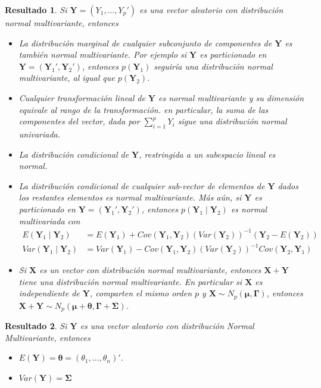 \documentclass[
  10pt,
  spanish,
]{book}
\providecommand{\tightlist}{%
  \setlength{\itemsep}{0pt}\setlength{\parskip}{0pt}}
\newtheorem{proposition}{Resultado}[chapter]
\theoremstyle{definition}
\theoremstyle{definition}
\theoremstyle{definition}
\theoremstyle{definition}
\theoremstyle{remark}
\begin{document}
\begin{proposition}
\protect\hypertarget{prp:normalmulti}{}{\label{prp:normalmulti} }Si \(\mathbf{Y}=(Y_1,\ldots,Y_p')\) es una vector aleatorio con distribución normal multivariante, entonces

\begin{itemize}
\tightlist
\item
  La distribución marginal de cualquier subconjunto de componentes de \(\mathbf{Y}\) es también normal multivariante. Por ejemplo si \(\mathbf{Y}\) es particionado en \(\mathbf{Y}=(\mathbf{Y}_1',\mathbf{Y}_2')\), entonces \(p(\mathbf{Y}_1)\) seguiría una distribución normal multivariante, al igual que \(p(\mathbf{Y}_2)\).
\item
  Cualquier transformación lineal de \(\mathbf{Y}\) es normal multivariante y su dimensión equivale al rango de la transformación. en particular, la suma de las componentes del vector, dada por \(\sum_{i=1}^pY_i\) sigue una distribución normal univariada.
\item
  La distribución condicional de \(\mathbf{Y}\), restringida a un subespacio lineal es normal.
\item
  La distribución condicional de cualquier sub-vector de elementos de \(\mathbf{Y}\) dados los restantes elementos es normal multivariante. Más aún, si \(\mathbf{Y}\) es particionado en \(\mathbf{Y}=(\mathbf{Y}_1',\mathbf{Y}_2')\), entonces \(p(\mathbf{Y}_1 \mid \mathbf{Y}_2)\) es normal multivariada con
  \begin{align*}
  E(\mathbf{Y}_1 \mid \mathbf{Y}_2)&=E(\mathbf{Y}_1)+Cov(\mathbf{Y}_1,\mathbf{Y}_2)(Var(\mathbf{Y}_2))^{-1}(\mathbf{Y}_2-E(\mathbf{Y}_2))\\
  Var(\mathbf{Y}_1 \mid \mathbf{Y}_2)&=Var(\mathbf{Y}_1)-Cov(\mathbf{Y}_1,\mathbf{Y}_2)(Var(\mathbf{Y}_2))^{-1}Cov(\mathbf{Y}_2,\mathbf{Y}_1)
  \end{align*}
\item
  Si \(\mathbf{X}\) es un vector con distribución normal multivariante, entonces \(\mathbf{X}+\mathbf{Y}\) tiene una distribución normal multivariante. En particular si \(\mathbf{X}\) es independiente de \(\mathbf{Y}\), comparten el mismo orden \(p\) y \(\mathbf{X}\sim N_p(\boldsymbol \mu,\boldsymbol \Gamma)\), entonces \(\mathbf{X}+\mathbf{Y}\sim N_p(\boldsymbol \mu+\boldsymbol \theta,\boldsymbol \Gamma+\boldsymbol \Sigma)\).
\end{itemize}
\end{proposition}

\begin{proposition}
\protect\hypertarget{prp:unnamed-chunk-56}{}{\label{prp:unnamed-chunk-56} }Si \(\mathbf{Y}\) es una vector aleatorio con distribución Normal Multivariante, entonces

\begin{itemize}
\tightlist
\item
  \(E(\mathbf{Y})=\boldsymbol \theta=(\theta_1,\ldots,\theta_n)'\).
\item
  \(Var(\mathbf{Y})=\boldsymbol \Sigma\)
\end{itemize}
\end{proposition}
\end{document}
